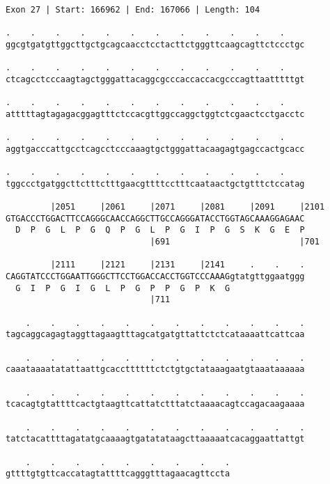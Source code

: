 \documentclass{article}
\begin{document}
\begin{Verbatim}[fontfamily=courier]
Exon 27 | Start: 166962 | End: 167066 | Length: 104

.    .    .    .    .    .    .    .    .    .    .    .    
ggcgtgatgttggcttgctgcagcaacctcctacttctgggttcaagcagttctccctgc

.    .    .    .    .    .    .    .    .    .    .    .    
ctcagcctcccaagtagctgggattacaggcgcccaccaccacgcccagttaatttttgt

.    .    .    .    .    .    .    .    .    .    .    .    
atttttagtagagacggagtttctccacgttggccaggctggtctcgaactcctgacctc

.    .    .    .    .    .    .    .    .    .    .    .    
aggtgacccattgcctcagcctcccaaagtgctgggattacaagagtgagccactgcacc

.    .    .    .    .    .    .    .    .    .    .    .    
tggccctgatggcttctttctttgaacgttttcctttcaataactgctgtttctccatag

         |2051     |2061     |2071     |2081     |2091     |2101
GTGACCCTGGACTTCCAGGGCAACCAGGCTTGCCAGGGATACCTGGTAGCAAAGGAGAAC
  D  P  G  L  P  G  Q  P  G  L  P  G  I  P  G  S  K  G  E  P
                             |691                          |701

         |2111     |2121     |2131     |2141     .    .    .
CAGGTATCCCTGGAATTGGGCTTCCTGGACCACCTGGTCCCAAAGgtatgttggaatggg
  G  I  P  G  I  G  L  P  G  P  P  G  P  K  G               
                             |711                           

    .    .    .    .    .    .    .    .    .    .    .    .
tagcaggcagagtaggttagaagtttagcatgatgttattctctcataaaattcattcaa

    .    .    .    .    .    .    .    .    .    .    .    .
caaataaaatatattaattgcaccttttttctctgtgctataaagaatgtaaataaaaaa

    .    .    .    .    .    .    .    .    .    .    .    .
tcacagtgtattttcactgtaagttcattatctttatctaaaacagtccagacaagaaaa

    .    .    .    .    .    .    .    .    .    .    .    .
tatctacattttagatatgcaaaagtgatatataagcttaaaaatcacaggaattattgt

    .    .    .    .    .    .    .    .    .
gttttgtgttcaccatagtattttcagggtttagaacagttccta
\end{Verbatim}
\newpage
\end{document}
